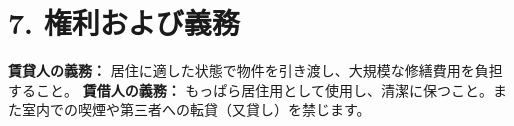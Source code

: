 \section*{7. 権利および義務}
\textbf{賃貸人の義務：} 居住に適した状態で物件を引き渡し、大規模な修繕費用を負担すること。
\textbf{賃借人の義務：} もっぱら居住用として使用し、清潔に保つこと。また室内での喫煙や第三者への転貸（又貸し）を禁じます。
